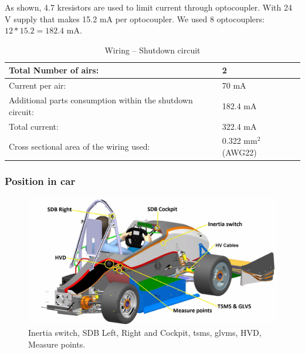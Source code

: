 As shown, 4.7 k\ohm resistors are used to limit current through optocoupler. With 24 V supply that makes 15.2 mA per optocoupler. We used 8 optocouplers: $12*15.2= 182.4$ mA.
\begin{table}[H]
	\centering
	\caption{Wiring – Shutdown circuit}
	\begin{tabu}{|X|X|}
		\hline
		Total Number of \glspl{air}: & 2 \\
		\hline
		Current per \gls{air}: & 70 mA \\
		\hline
		Additional parts consumption within the shutdown circuit: & 182.4 mA \\
		\hline
		Total current: & 322.4 mA \\
		\hline
		Cross sectional area of the wiring used: & 0.322 mm$^2$ (AWG22) \\
		\hline
	\end{tabu}%
	\label{tab:SDC-Wiring}%
\end{table}%


\subsubsection{Position in car}

\begin{figure}[H]
	\includegraphics[width=\textwidth]{./img/car-pos.jpg}
	\caption{Inertia switch, SDB Left, Right and Cockpit, \gls{tsms}, \gls{glvms}, HVD, Measure points.}
	\label{fig:SDC-positionInCar}
\end{figure}
